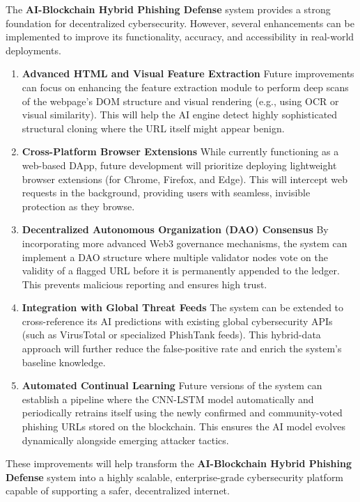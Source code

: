 The \textbf{AI-Blockchain Hybrid Phishing Defense} system provides a strong foundation for decentralized cybersecurity. However, several enhancements can be implemented to improve its functionality, accuracy, and accessibility in real-world deployments.

\begin{enumerate}

\item \textbf{Advanced HTML and Visual Feature Extraction}  
Future improvements can focus on enhancing the feature extraction module to perform deep scans of the webpage's DOM structure and visual rendering (e.g., using OCR or visual similarity). This will help the AI engine detect highly sophisticated structural cloning where the URL itself might appear benign.



\item \textbf{Cross-Platform Browser Extensions}  
While currently functioning as a web-based DApp, future development will prioritize deploying lightweight browser extensions (for Chrome, Firefox, and Edge). This will intercept web requests in the background, providing users with seamless, invisible protection as they browse.

\item \textbf{Decentralized Autonomous Organization (DAO) Consensus}  
By incorporating more advanced Web3 governance mechanisms, the system can implement a DAO structure where multiple validator nodes vote on the validity of a flagged URL before it is permanently appended to the ledger. This prevents malicious reporting and ensures high trust.

\item \textbf{Integration with Global Threat Feeds}  
The system can be extended to cross-reference its AI predictions with existing global cybersecurity APIs (such as VirusTotal or specialized PhishTank feeds). This hybrid-data approach will further reduce the false-positive rate and enrich the system's baseline knowledge.

\item \textbf{Automated Continual Learning}  
Future versions of the system can establish a pipeline where the CNN-LSTM model automatically and periodically retrains itself using the newly confirmed and community-voted phishing URLs stored on the blockchain. This ensures the AI model evolves dynamically alongside emerging attacker tactics.

\end{enumerate}

These improvements will help transform the \textbf{AI-Blockchain Hybrid Phishing Defense} system into a highly scalable, enterprise-grade cybersecurity platform capable of supporting a safer, decentralized internet.